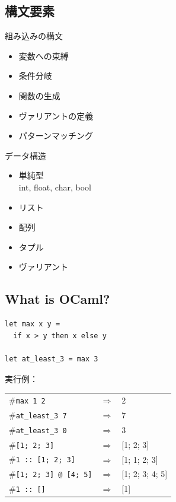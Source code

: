 \documentclass[papersize,30pt,slide]{jsarticle}
\begin{document}
\subsection{構文要素}
\begin{multicols}{2}

組み込みの構文 %
\begin{itemize}
\item 変数への束縛 
\item 条件分岐
\item 関数の生成
\item ヴァリアントの定義
\item パターンマッチング
\end{itemize} %

データ構造 %
\begin{itemize}
\item 単純型 \\ int, float, char, bool
\item リスト
\item 配列
\item タプル
\item ヴァリアント
\end{itemize}
\end{multicols}

\newpage
\subsection{What is OCaml?}
\begin{lstlisting}
let max x y =
  if x > y then x else y

let at_least_3 = max 3
\end{lstlisting}
{
実行例：\vspace{-20pt}
\begin{tabular}{lcl}
\#\lstinline|max 1 2| &$\Longrightarrow$& 2\\
\#\lstinline|at_least_3 7| &$\Longrightarrow$& 7\\
\#\lstinline|at_least_3 0| &$\Longrightarrow$& 3\\
\#\lstinline|[1; 2; 3]| &$\Longrightarrow$& [1; 2; 3]\\
\#\lstinline|1 :: [1; 2; 3]| &$\Longrightarrow$& [1; 1; 2; 3]\\
\#\lstinline|[1; 2; 3] @ [4; 5]| &$\Longrightarrow$& [1; 2; 3; 4; 5]\\
\#\lstinline|1 :: []| &$\Longrightarrow$& [1]\\
\end{tabular}
\newpage
}
\end{document}
